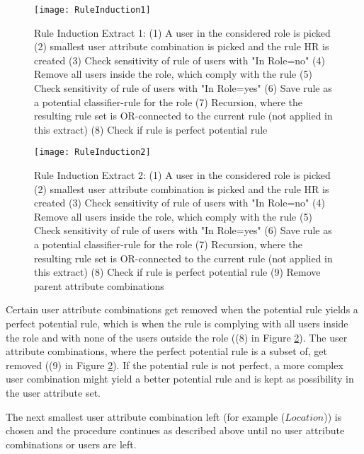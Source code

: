 \begin{itemize}
        	\begin{landscape}
        		\begin{figure}
        			\centering
        			\texttt{[image: RuleInduction1]}
        			\caption{Rule Induction Extract 1: (1) A user in the considered role is picked (2) smallest user attribute combination is picked and the rule {HR} is created (3) Check sensitivity of rule of users with "In Role=no" (4) Remove all users inside the role, which comply with the rule (5) Check sensitivity of rule of users with "In Role=yes" (6) Save rule as a potential classifier-rule for the role (7) Recursion, where the resulting rule set is OR-connected to the current rule (not applied in this extract) (8) Check if rule is perfect potential rule}
        			\label{fig:ruleInduction1}
        		\end{figure}
        		\begin{figure}
        			\centering
        			\texttt{[image: RuleInduction2]} 
        			\caption{Rule Induction Extract 2: (1) A user in the considered role is picked (2) smallest user attribute combination is picked and the rule {HR} is created (3) Check sensitivity of rule of users with "In Role=no" (4) Remove all users inside the role, which comply with the rule (5) Check sensitivity of rule of users with "In Role=yes" (6) Save rule as a potential classifier-rule for the role (7) Recursion, where the resulting rule set is OR-connected to the current rule (not applied in this extract) (8) Check if rule is perfect potential rule (9) Remove parent attribute combinations}
        			\label{fig:ruleInduction2}
        		\end{figure}
        	\end{landscape}
        	
        	Certain user attribute combinations get removed when the potential rule yields a perfect potential rule, which is when the rule is complying with all users inside the role and with none of the users outside the role ((8) in Figure \ref{fig:ruleInduction2}). The user attribute combinations, where the perfect potential rule is a subset of, get removed ((9) in Figure \ref{fig:ruleInduction2}). If the potential rule is not perfect, a more complex user combination might yield a better potential rule and is kept as possibility in the user attribute set.
        	
        	The next smallest user attribute combination left (for example ($Location$)) is chosen and the procedure continues as described above until no user attribute combinations or users are left.
        	 
        \end{itemize}
        
